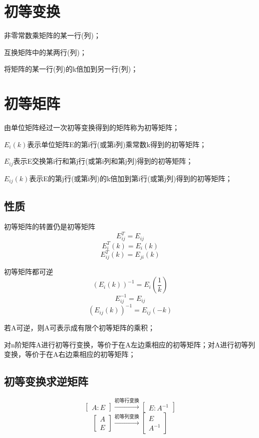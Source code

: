 \section{初等变换}

非零常数乘矩阵的某一行(列)；

互换矩阵中的某两行(列)；

将矩阵的某一行(列)的k倍加到另一行(列)；


\section{初等矩阵}
由单位矩阵经过一次初等变换得到的矩阵称为初等矩阵；

\(E_i(k)\)表示单位矩阵E的第i行(或第i列)乘常数k得到的初等矩阵；

\(E_{ij}\)表示E交换第i行和第j行(或第i列和第j列)得到的初等矩阵；

\(E_{ij}(k)\)表示E的第j行(或第i列)的k倍加到第i行(或第j列)得到的初等矩阵；

\subsection{性质}

初等矩阵的转置仍是初等矩阵
\[E_{ij}^T = E_{ij}\]
\[E_i^T(k) = E_i(k)\]
\[E_{ij}^T(k) = E_{ji}(k)\]

初等矩阵都可逆
\[(E_i(k))^{-1} = E_i(\frac{1}{k})\]
\[E_{ij}^{-1} = E_{ij}\]
\[(E_{ij}(k))^{-1} = E_{ij}(-k)\]

若A可逆，则A可表示成有限个初等矩阵的乘积；

对n阶矩阵A进行初等行变换，等价于在A左边乘相应的初等矩阵；对A进行初等列变换，等价于在A右边乘相应的初等矩阵；


\subsection{初等变换求逆矩阵}
\[
\begin{bmatrix}
A:E
\end{bmatrix}
\xrightarrow{\text{初等行变换}}
\begin{bmatrix}
E:A^{-1}
\end{bmatrix}
\]
\[
\begin{bmatrix}
A \\ 
E
\end{bmatrix}
\xrightarrow{\text{初等列变换}}
\begin{bmatrix}
E \\ 
A^{-1}
\end{bmatrix}
\]

